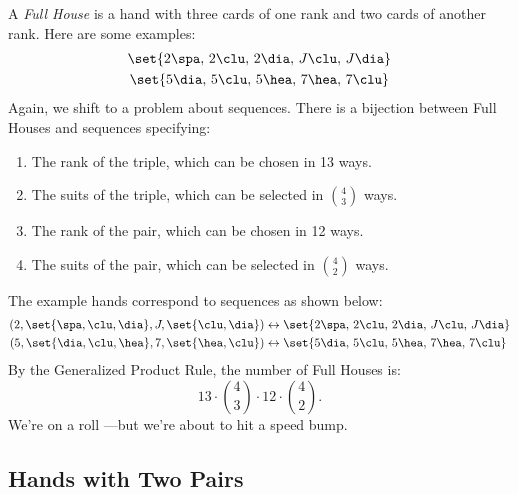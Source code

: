 A \emph{Full House} is a hand with three cards of one rank and
two cards of another rank.  Here are some examples:
%
\begin{gather*}
\set{ 2 \spa, \, 2 \clu, \, 2 \dia, \, J \clu, \, J \dia } \\
\set{ 5 \dia, \, 5 \clu, \, 5 \hea, \, 7 \hea, \, 7 \clu }
\end{gather*}
%
Again, we shift to a problem about sequences.  There is a bijection
between Full Houses and sequences specifying:
%
\begin{enumerate}
\item The rank of the triple, which can be chosen in 13 ways.
\item The suits of the triple, which can be selected in $\binom{4}{3}$ ways.
\item The rank of the pair, which can be chosen in 12 ways.
\item The suits of the pair, which can be selected in $\binom{4}{2}$ ways.
\end{enumerate}
%
The example hands correspond to sequences as shown below:
\begin{align*}
(2, \set{\spa, \clu, \dia}, J, \set{\clu, \dia})
    & \leftrightarrow
    \set{ 2 \spa, \, 2 \clu, \, 2 \dia, \, J \clu, \, J \dia } \\
(5, \set{\dia, \clu, \hea}, 7, \set{\hea, \clu})
    & \leftrightarrow
    \set{ 5 \dia, \, 5 \clu, \, 5 \hea, \, 7 \hea, \, 7 \clu }
\end{align*}
%
By the Generalized Product Rule, the number of Full Houses is:
%
\[
    13 \cdot \binom{4}{3} \cdot 12 \cdot \binom{4}{2}.
\]
%
We're on a roll ---but we're about to hit a speed bump.

\subsection{Hands with Two Pairs}

